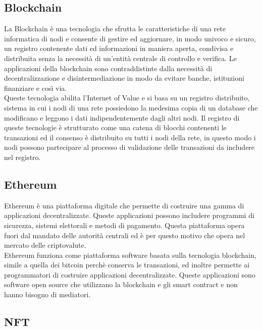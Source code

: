 \subsection{Blockchain}

La Blockchain è una tecnologia che sfrutta le caratteristiche di una rete informatica di nodi e consente di gestire ed aggiornare, in modo univoco e sicuro, un registro contenente dati ed informazioni in maniera aperta, condivisa e distribuita senza la necessità di un'entità centrale di controllo e verifica. Le applicazioni della blockchain sono contraddistinte dalla necessità di decentralizzazione e disintermediazione in modo da evitare banche, istituzioni finanziare e così via.\\
Queste tecnologia abilita l'Internet of Value e si basa su un registro distribuito, sistema in cui i nodi di una rete possiedono la medesima copia di un database che modificano e leggono i dati indipendentemente dagli altri nodi. Il registro di queste tecnologie è strutturato come una catena di blocchi contenenti le transazioni ed il consenso è distribuito su tutti i nodi della rete, in questo modo i nodi possono partecipare al processo di validazione delle transazioni da includere nel registro.

\subsection{Ethereum}

Ethereum è una piattaforma digitale che permette di costruire una gamma di applicazioni decentralizzate. Queste applicazioni possono includere programmi di sicurezza, sistemi elettorali e metodi di pagamento. Questa piattaforma opera fuori dal mandato delle autorità centrali ed è per questo motivo che opera nel mercato delle criptovalute.\\
Ethereum funziona come piattaforma software basata sulla tecnologia blockchain, simile a quella dei bitcoin perchè conserva le transazioni, ed inoltre permette ai programmatori di costruire applicazioni decentralizzate. Queste applicazioni sono software open source che utilizzano la blockchain e gli smart contract e non hanno bisogno di mediatori. 

\subsection{NFT}

